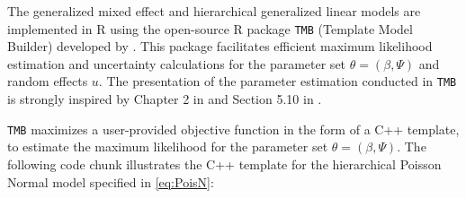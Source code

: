 \documentclass[preprint, 3p,
authoryear]{elsarticle} %
\begin{document}
The generalized mixed effect and hierarchical generalized linear models
are implemented in R using the open-source R package \texttt{TMB}
(Template Model Builder) developed by \citet{Kristensen_2016}. This
package facilitates efficient maximum likelihood estimation and
uncertainty calculations for the parameter set \(\theta=(\beta, \Psi)\)
and random effects \(u\). The presentation of the parameter estimation
conducted in \texttt{TMB} is strongly inspired by Chapter 2 in
\citet{Kristensen_2016} and Section 5.10 in \citet{Madsen_2010}.

\texttt{TMB} maximizes a user-provided objective function in the form of
a C++ template, to estimate the maximum likelihood for the parameter set
\(\theta=(\beta, \Psi)\). The following code chunk illustrates the C++
template for the hierarchical Poisson Normal model specified in
\ref{eq:PoisN}:
\end{document}
